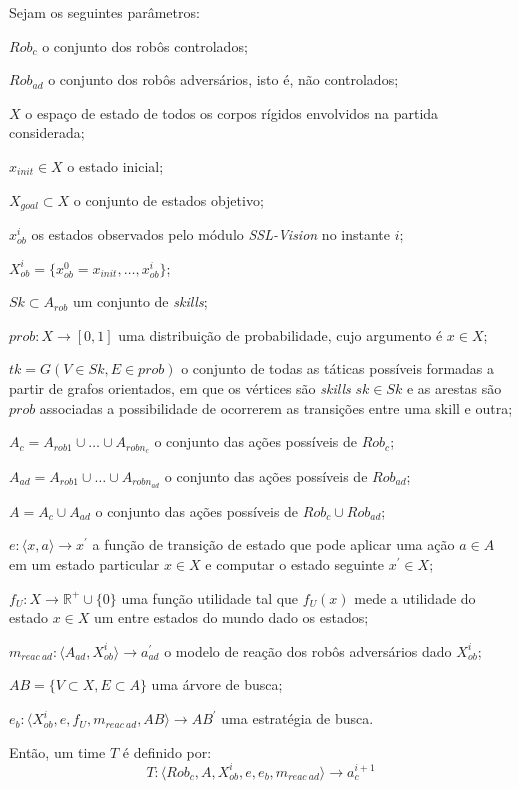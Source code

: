 \begin{defi}[Time]\label{def:time}
  Sejam os seguintes parâmetros:

  \begin{description}
    \item $Rob_c$ o conjunto dos robôs controlados;
    \item $Rob_{ad}$ o conjunto dos robôs adversários, isto é, não controlados;
    \item $X$ o espaço de estado de todos os corpos rígidos envolvidos na partida considerada;
    \item $x_{init} \in X$ o estado inicial;
    \item $X_{goal}\subset X$ o conjunto de estados objetivo;
    \item $x_{ob}^{i}$ os estados observados pelo módulo \textit{SSL-Vision} no instante $i$;
    \item $X_{ob}^{i} =  \lbrace{x_{ob}^{0} = x_{init},\dots,x_{ob}^{i}}\rbrace$;
    \item $Sk \subset A_{rob}$ um conjunto de \textit{skills};
    \item $prob: X \longrightarrow [0,1]$ uma distribuição de probabilidade, cujo argumento é
      $x \in X$;
    \item $tk = G(V \in Sk, E \in {prob} )$ o conjunto de todas as táticas possíveis
      formadas a partir de grafos orientados, em que os vértices são \textit{skills} $sk \in Sk$
      e as arestas são $prob$ associadas a possibilidade de ocorrerem as transições
      entre uma skill e outra;
    \item $A_c = A_{rob 1} \cup \dots \cup A_{rob n_c}$ o conjunto das ações possíveis de $Rob_c$;
    \item $A_{ad} = A_{rob 1} \cup \dots \cup A_{rob n_{ad}}$ o conjunto das ações possíveis de $Rob_{ad}$;
    \item $A = A_c \cup A_{ad}$ o conjunto das ações possíveis de $Rob_c \cup Rob_{ad}$;
    \item $e: \langle x,a \rangle \longrightarrow x^{'}$ a função de transição de estado que pode
      aplicar uma ação $a\in A$ em um estado particular
      $x \in X$ e computar o estado seguinte $x^{'} \in X$;
    \item $f_{U}: X \longrightarrow \mathbb{R^{+}} \cup\lbrace 0\rbrace$ uma função utilidade tal que
      $f_{U}(x)$ mede a utilidade do estado $x \in X$ um entre estados do mundo dado os estados;
    \item $m_{reac{\ }ad}: \langle A_{ad}, X_{ob}^{i}\rangle \longrightarrow a_{ad}^{'}$ o modelo de reação dos robôs
      adversários dado $X_{ob}^{i}$;
    \item $AB =\lbrace V \subset X, E \subset A\rbrace$ uma árvore de busca;
    \item $e_b: \langle X_{ob}^{i}, e, f_{U}, m_{reac{\ }ad}, AB\rangle \longrightarrow AB^{'}$ uma estratégia de busca.
  \end{description}

  Então, um time $T$ é definido por:
  \[
    T: \langle Rob_c, A, X_{ob}^{i}, e, e_b, m_{reac{\ }ad} \rangle \longrightarrow a_c^{i+1}
  \]
\end{defi}

